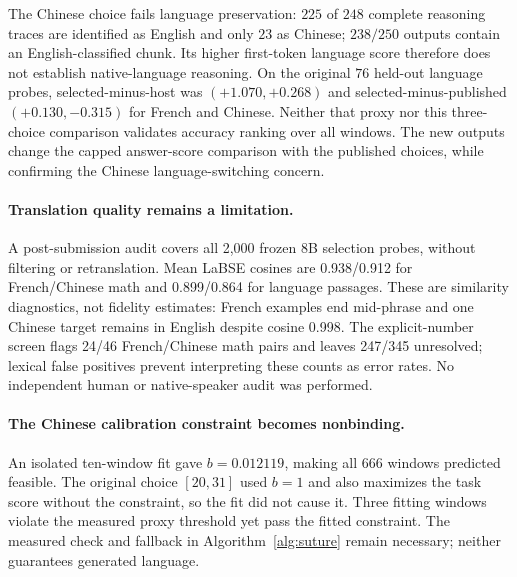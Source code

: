 \documentclass{article}
\theoremstyle{plain}
\theoremstyle{definition}
\theoremstyle{remark}
\begin{document}
The Chinese choice fails language preservation: $225$ of $248$ complete
reasoning traces are identified as English and only $23$ as Chinese; $238/250$
outputs contain an English-classified chunk. Its higher first-token language
score therefore does not establish native-language reasoning. On the original
$76$ held-out language probes, selected-minus-host was $(+1.070,+0.268)$ and
selected-minus-published $(+0.130,-0.315)$ for French and Chinese. Neither that
proxy nor this three-choice comparison validates accuracy ranking over all
windows. The new outputs change the capped answer-score comparison with the
published choices, while confirming the Chinese language-switching concern.

\paragraph{Translation quality remains a limitation.}
A post-submission audit covers all 2,000 frozen 8B selection probes, without
filtering or retranslation. Mean LaBSE
cosines are 0.938/0.912 for French/Chinese math and 0.899/0.864 for language
passages. These are similarity diagnostics, not fidelity estimates: French
examples end mid-phrase and one Chinese target remains in English despite
cosine 0.998. The explicit-number screen flags 24/46 French/Chinese math pairs
and leaves 247/345 unresolved; lexical false positives prevent interpreting
these counts as error rates. No independent human or native-speaker audit was performed.

\paragraph{The Chinese calibration constraint becomes nonbinding.}
An isolated ten-window fit gave $b=0.012119$, making all $666$ windows
predicted feasible. The original choice $[20,31]$ used $b=1$ and also maximizes
the task score without the constraint, so the fit did not cause it. Three
fitting windows violate the measured proxy threshold yet pass the fitted
constraint. The measured check and fallback in Algorithm~\ref{alg:suture}
remain necessary; neither guarantees generated language.
\end{document}
